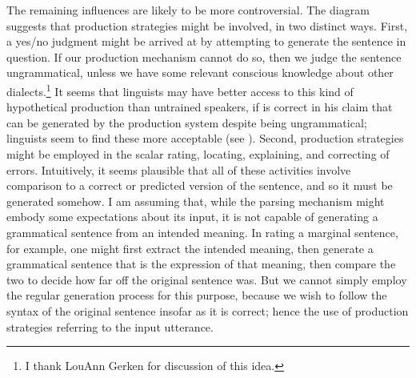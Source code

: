 The remaining influences are likely to be more controversial. The diagram suggests that production strategies might be involved, in two distinct ways. First, a yes/no judgment might be arrived at by attempting to generate the sentence in question. If our production mechanism cannot do so, then we judge the sentence ungrammatical, unless we have some relevant conscious knowledge about other dialects.\footnote{I thank LouAnn Gerken for discussion of this idea.}
It seems that linguists may have better access to this kind of hypothetical production than untrained speakers, if \citet{Kroch1981}
is correct in his claim that  can be generated by the production system despite being ungrammatical; linguists seem to find these more acceptable (see ). Second, production strategies might be employed in the scalar rating, locating, explaining, and correcting of errors. Intuitively, it seems plausible that all of these activities involve comparison to a correct or predicted version of the sentence, and so it must be generated somehow. I am assuming that, while the parsing mechanism might embody some expectations about its input, it is not capable of generating a grammatical sentence from an intended meaning. In rating a marginal sentence, for example, one might first extract the intended meaning, then generate a grammatical sentence that is the expression of that meaning, then compare the two to decide how far off the original sentence was. But we cannot simply employ the regular generation process for this purpose, because we wish to follow the syntax of the original sentence insofar as it is correct; hence the use of production strategies referring to the input utterance.

